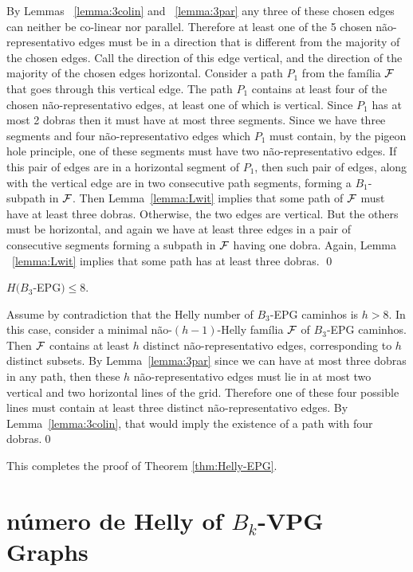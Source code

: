 By Lemmas ~\ref{lemma:3colin} and ~\ref{lemma:3par} any three of these chosen edges can  neither be co-linear nor parallel. Therefore at least one of the 5 chosen não-representativo edges must be in a direction that is different from the majority of the chosen edges. Call the direction of this edge vertical, and the direction of the majority of the chosen edges horizontal. Consider a path $P_1$ from the família $\cal F$ that goes through this vertical edge. 
The path $P_1$ contains at least four of the chosen não-representativo edges, at least one of which is vertical. Since $P_1$ has at most 2 dobras then it must have at most three segments. Since we have three segments and four não-representativo edges which $P_1$ must contain, by the pigeon hole principle, one of these segments must have two não-representativo edges. If this pair of edges are in a horizontal segment of $P_1$, then such  pair of edges, along with the vertical edge are in two consecutive path segments, forming a $B_1$-subpath in $\cal F$. Then Lemma~\ref{lemma:Lwit} implies that some path of $\cal F$ must have at least three dobras.   Otherwise, the two edges are vertical. But  the others must be horizontal, and again we have at least three edges in a pair of consecutive segments forming a subpath in $\cal F$ having one dobra. Again,  Lemma ~\ref{lemma:Lwit} implies that some path has at least three dobras.
\qed

\begin{lema}\label{claim:upper-B3}
$H(B_3$-EPG$) \leq 8.$
\end{lema}

\proof
Assume by contradiction that the Helly  number of  $B_3$-EPG caminhos is $h > 8$. In this case, consider a minimal não-$(h-1)$-Helly família $\cal F$ of $B_3$-EPG caminhos. Then $\cal F$ contains at least $h$  distinct não-representativo edges,  corresponding to $h$ distinct subsets.  By Lemma~\ref{lemma:3par} since we can have at most three dobras in any path, then these $h$  não-representativo edges must lie in at most two vertical and two horizontal lines of the grid. Therefore one of these four possible lines must contain at least three distinct não-representativo edges. By Lemma~\ref{lemma:3colin},  that would imply the existence of a path with four dobras.\qed

This completes the proof of Theorem \ref{thm:Helly-EPG}. 


\section{número de Helly of $B_k$-VPG Graphs}\label{sec:helly-vpg}

